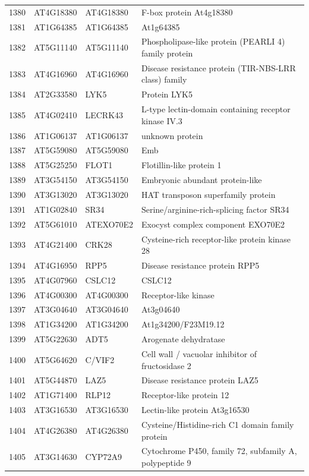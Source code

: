 \documentclass[11pt]{article}
\begin{document}
\begin{center}
\begin{tabular}{rlll}
1380 & AT4G18380 & AT4G18380 & F-box protein At4g18380\\
1381 & AT1G64385 & AT1G64385 & At1g64385\\
1382 & AT5G11140 & AT5G11140 & Phospholipase-like protein (PEARLI 4) family protein\\
1383 & AT4G16960 & AT4G16960 & Disease resistance protein (TIR-NBS-LRR class) family\\
1384 & AT2G33580 & LYK5 & Protein LYK5\\
1385 & AT4G02410 & LECRK43 & L-type lectin-domain containing receptor kinase IV.3\\
1386 & AT1G06137 & AT1G06137 & unknown protein\\
1387 & AT5G59080 & AT5G59080 & Emb\\
1388 & AT5G25250 & FLOT1 & Flotillin-like protein 1\\
1389 & AT3G54150 & AT3G54150 & Embryonic abundant protein-like\\
1390 & AT3G13020 & AT3G13020 & HAT transposon superfamily protein\\
1391 & AT1G02840 & SR34 & Serine/arginine-rich-splicing factor SR34\\
1392 & AT5G61010 & ATEXO70E2 & Exocyst complex component EXO70E2\\
1393 & AT4G21400 & CRK28 & Cysteine-rich receptor-like protein kinase 28\\
1394 & AT4G16950 & RPP5 & Disease resistance protein RPP5\\
1395 & AT4G07960 & CSLC12 & CSLC12\\
1396 & AT4G00300 & AT4G00300 & Receptor-like kinase\\
1397 & AT3G04640 & AT3G04640 & At3g04640\\
1398 & AT1G34200 & AT1G34200 & At1g34200/F23M19.12\\
1399 & AT5G22630 & ADT5 & Arogenate dehydratase\\
1400 & AT5G64620 & C/VIF2 & Cell wall / vacuolar inhibitor of fructosidase 2\\
1401 & AT5G44870 & LAZ5 & Disease resistance protein LAZ5\\
1402 & AT1G71400 & RLP12 & Receptor-like protein 12\\
1403 & AT3G16530 & AT3G16530 & Lectin-like protein At3g16530\\
1404 & AT4G26380 & AT4G26380 & Cysteine/Histidine-rich C1 domain family protein\\
1405 & AT3G14630 & CYP72A9 & Cytochrome P450, family 72, subfamily A, polypeptide 9\\

\end{tabular}
\end{center}
\end{document}
